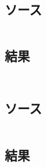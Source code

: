 \documentclass[11pt,a4paper,a4j]{jsarticle}
\begin{document}
\section{}
\subsection{ソース}
\begin{shadebox}
\begin{verbatim}

\end{verbatim}
\end{shadebox}

\subsection{結果}
\begin{shadebox}
\begin{verbatim}

\end{verbatim}
\end{shadebox}
\clearpage

\section{}
\subsection{ソース}
\begin{shadebox}
\begin{verbatim}

\end{verbatim}
\end{shadebox}

\subsection{結果}
\begin{shadebox}
\begin{verbatim}

\end{verbatim}
\end{shadebox}
\clearpage
\end{document}
